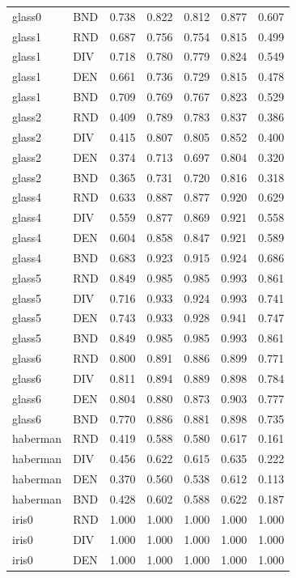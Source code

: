 \documentclass[10pt,a4paper]{article}
\begin{document}
\begin{longtable}{lllllrr}
glass0 & BND & 0.738 & 0.822 & 0.812 & 0.877 & 0.607 \\
glass1 & RND & 0.687 & 0.756 & 0.754 & 0.815 & 0.499 \\
glass1 & DIV & 0.718 & 0.780 & 0.779 & 0.824 & 0.549 \\
glass1 & DEN & 0.661 & 0.736 & 0.729 & 0.815 & 0.478 \\
glass1 & BND & 0.709 & 0.769 & 0.767 & 0.823 & 0.529 \\
glass2 & RND & 0.409 & 0.789 & 0.783 & 0.837 & 0.386 \\
glass2 & DIV & 0.415 & 0.807 & 0.805 & 0.852 & 0.400 \\
glass2 & DEN & 0.374 & 0.713 & 0.697 & 0.804 & 0.320 \\
glass2 & BND & 0.365 & 0.731 & 0.720 & 0.816 & 0.318 \\
glass4 & RND & 0.633 & 0.887 & 0.877 & 0.920 & 0.629 \\
glass4 & DIV & 0.559 & 0.877 & 0.869 & 0.921 & 0.558 \\
glass4 & DEN & 0.604 & 0.858 & 0.847 & 0.921 & 0.589 \\
glass4 & BND & 0.683 & 0.923 & 0.915 & 0.924 & 0.686 \\
glass5 & RND & 0.849 & 0.985 & 0.985 & 0.993 & 0.861 \\
glass5 & DIV & 0.716 & 0.933 & 0.924 & 0.993 & 0.741 \\
glass5 & DEN & 0.743 & 0.933 & 0.928 & 0.941 & 0.747 \\
glass5 & BND & 0.849 & 0.985 & 0.985 & 0.993 & 0.861 \\
glass6 & RND & 0.800 & 0.891 & 0.886 & 0.899 & 0.771 \\
glass6 & DIV & 0.811 & 0.894 & 0.889 & 0.898 & 0.784 \\
glass6 & DEN & 0.804 & 0.880 & 0.873 & 0.903 & 0.777 \\
glass6 & BND & 0.770 & 0.886 & 0.881 & 0.898 & 0.735 \\
haberman & RND & 0.419 & 0.588 & 0.580 & 0.617 & 0.161 \\
haberman & DIV & 0.456 & 0.622 & 0.615 & 0.635 & 0.222 \\
haberman & DEN & 0.370 & 0.560 & 0.538 & 0.612 & 0.113 \\
haberman & BND & 0.428 & 0.602 & 0.588 & 0.622 & 0.187 \\
iris0 & RND & 1.000 & 1.000 & 1.000 & 1.000 & 1.000 \\
iris0 & DIV & 1.000 & 1.000 & 1.000 & 1.000 & 1.000 \\
iris0 & DEN & 1.000 & 1.000 & 1.000 & 1.000 & 1.000 \\

\end{longtable}
\end{document}
